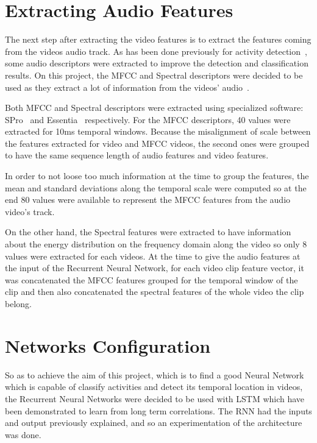 \section{Extracting Audio Features}

The next step after extracting the video features is to extract the features coming from the videos audio track. As has been done previously for activity detection~\cite{xu2015uts}, some audio descriptors were extracted to improve the detection and classification results. On this project, the MFCC and Spectral descriptors were decided to be used as they extract a lot of information from the videos' audio~\cite{heittola2013context}. 

Both MFCC and Spectral descriptors were extracted using specialized software: SPro~\cite{gravier2010spro} and Essentia~\cite{bogdanov2013essentia} respectively. For the MFCC descriptors, 40 values were extracted for 10ms temporal windows. Because the misalignment of scale between the features extracted for video and MFCC videos, the second ones were grouped to have the same sequence length of audio features and video features. 

In order to not loose too much information at the time to group the features, the mean and standard deviations along the temporal scale were computed so at the end 80 values were available to represent the MFCC features from the audio video's track.

On the other hand, the Spectral features were extracted to have information about the energy distribution on the frequency domain along the video so only 8 values were extracted for each videos. At the time to give the audio features at the input of the Recurrent Neural Network, for each video clip feature vector, it was concatenated the MFCC features grouped for the temporal window of the clip and then also concatenated the spectral features of the whole video the clip belong. 

\section{Networks Configuration}

So as to achieve the aim of this project, which is to find a good Neural Network which is capable of classify activities and detect its temporal location in videos, the Recurrent Neural Networks were decided to be used with LSTM which have been demonstrated to learn from long term correlations. The RNN had the inputs and output previously explained, and so an experimentation of the architecture was done. 

